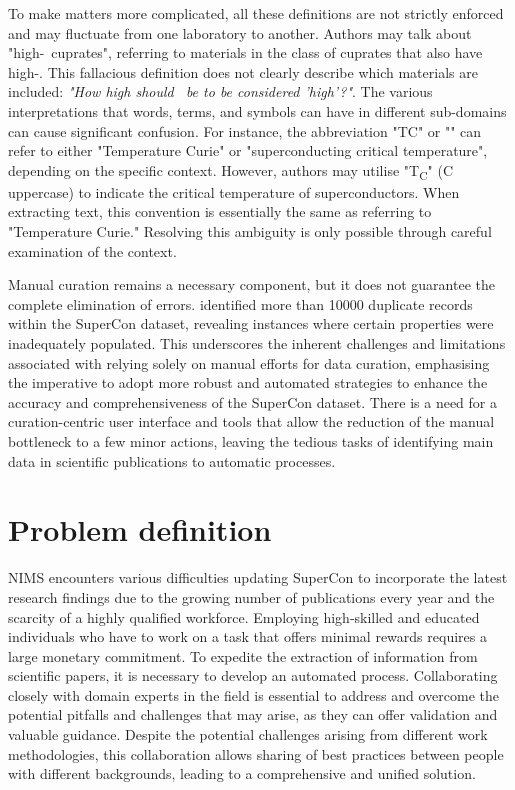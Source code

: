 To make matters more complicated, all these definitions are not strictly enforced and may fluctuate from one laboratory to another. 
Authors may talk about "high-\tc~cuprates", referring to materials in the class of cuprates that also have high-\tc. This fallacious definition does not clearly describe which materials are included: \textit{"How high should \tc~be to be considered 'high'?"}.
The various interpretations that words, terms, and symbols can have in different sub-domains can cause significant confusion. For instance, the abbreviation "TC" or "\tc" can refer to either "Temperature Curie" or "superconducting critical temperature", depending on the specific context. However, authors may utilise "T\textsubscript{C}" (C uppercase) to indicate the critical temperature of superconductors. When extracting text, this convention is essentially the same as referring to "Temperature Curie." Resolving this ambiguity is only possible through careful examination of the context.

Manual curation remains a necessary component, but it does not guarantee the complete elimination of errors. \cite{sommer20223dsc} identified more than 10000 duplicate records within the SuperCon dataset, revealing instances where certain properties were inadequately populated. 
This underscores the inherent challenges and limitations associated with relying solely on manual efforts for data curation, emphasising the imperative to adopt more robust and automated strategies to enhance the accuracy and comprehensiveness of the SuperCon dataset.
There is a need for a curation-centric user interface and tools that allow the reduction of the manual bottleneck to a few minor actions, leaving the tedious tasks of identifying main data in scientific publications to automatic processes.


\section{Problem definition}

NIMS encounters various difficulties updating SuperCon to incorporate the latest research findings due to the growing number of publications every year and the scarcity of a highly qualified workforce. 
Employing high-skilled and educated individuals who have to work on a task that offers minimal rewards requires a large monetary commitment.
To expedite the extraction of information from scientific papers, it is necessary to develop an automated process.
Collaborating closely with domain experts in the field is essential to address and overcome the potential pitfalls and challenges that may arise, as they can offer validation and valuable guidance.
Despite the potential challenges arising from different work methodologies, this collaboration allows sharing of best practices between people with different backgrounds, leading to a comprehensive and unified solution.

